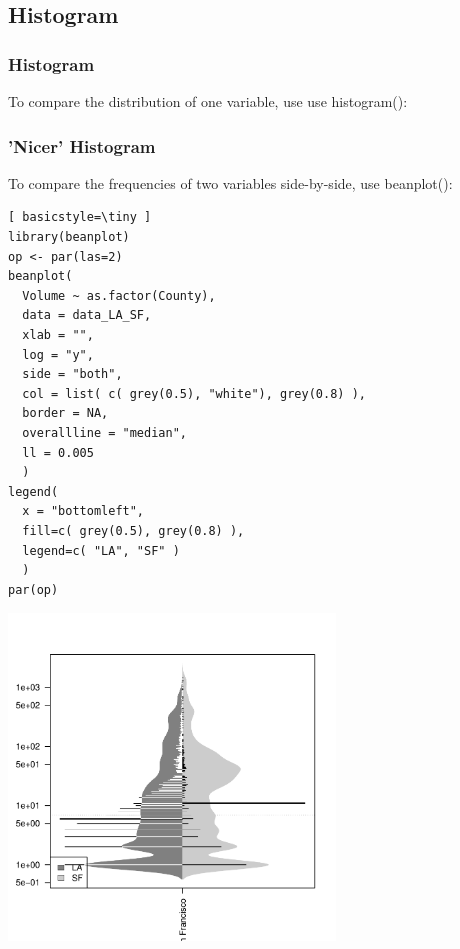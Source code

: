 
\subsection{Histogram}

\begin{frame}
	\frametitle{Histogram}
To compare the distribution of one variable, use use \ttfamily histogram(): \normalfont

\end{frame}

\begin{frame}
	\frametitle{'Nicer' Histogram}

To compare the frequencies of two variables side-by-side, use \ttfamily beanplot(): \normalfont

	\begin{lstlisting}[ basicstyle=\tiny ]
library(beanplot)
op <- par(las=2)
beanplot(
  Volume ~ as.factor(County), 
  data = data_LA_SF, 
  xlab = "",
  log = "y",
  side = "both", 
  col = list( c( grey(0.5), "white"), grey(0.8) ), 
  border = NA, 
  overallline = "median", 
  ll = 0.005
  )
legend(
  x = "bottomleft",
  fill=c( grey(0.5), grey(0.8) ), 
  legend=c( "LA", "SF" )
  )
par(op)
	\end{lstlisting}

        \begin{center}
	         \includegraphics[width=0.65\textwidth]{images/beanplot_v0.pdf}
        \end{center}

\end{frame}


